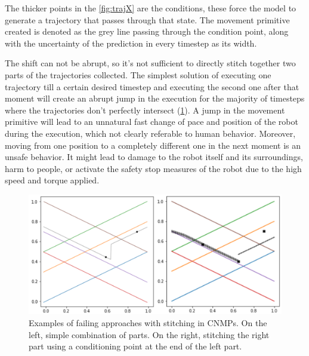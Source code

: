 The thicker points in the \cref{fig:trajX} are the conditions, these force the model to generate a trajectory that passes through that state. The movement primitive created is denoted as the grey line passing through the condition point, along with the uncertainty of the prediction in every timestep as its width. 

The shift can not be abrupt, so it's not sufficient to directly stitch together two parts of the trajectories collected. 
The simplest solution of executing one trajectory till a certain desired timestep and executing the second one after that moment will create an abrupt jump in the execution for the majority of timesteps where the trajectories don't perfectly intersect (\cref{fig:trajX-failing-approaches}). A jump in the movement primitive will lead to an unnatural fast change of pace and position of the robot during the execution, which not clearly referable to human behavior. Moreover, moving from one position to a completely different one in the next moment is an unsafe behavior. It might lead to damage to the robot itself and its surroundings, harm to people, or activate the safety stop measures of the robot due to the high speed and torque applied.  

\begin{figure}
    \centering
    \includegraphics[width=0.8\linewidth]{figures/trajX-failing-approaches.png}
    \caption{Examples of failing approaches with stitching in CNMPs. On the left, simple combination of parts. On the right, stitching the right part using a conditioning point at the end of the left part.}
    \label{fig:trajX-failing-approaches}
\end{figure}

